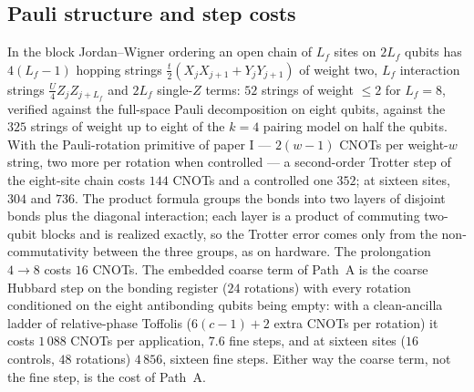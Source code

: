 \documentclass[a4paper,11pt,noarxiv]{quantumarticle}
\begin{document}
\subsection{Pauli structure and step costs}
In the block Jordan--Wigner ordering an open chain of $L_f$ sites on $2L_f$
qubits has $4(L_f-1)$ hopping strings $\tfrac t2(X_jX_{j+1}+Y_jY_{j+1})$ of
weight two, $L_f$ interaction strings $\tfrac U4Z_jZ_{j+L_f}$ and $2L_f$
single-$Z$ terms: $52$ strings of weight $\le2$ for $L_f=8$, verified
against the full-space Pauli decomposition on eight qubits, against the
$325$ strings of weight up to eight of the $k=4$ pairing model on half the
qubits.  With the Pauli-rotation primitive of paper I --- $2(w-1)$ CNOTs per
weight-$w$ string, two more per rotation when controlled --- a second-order
Trotter step of the eight-site chain costs $144$ CNOTs and a controlled one
$352$; at sixteen sites, $304$ and $736$.  The product formula groups the
bonds into two layers of disjoint bonds plus the diagonal interaction; each
layer is a product of commuting two-qubit blocks and is realized exactly, so
the Trotter error comes only from the non-commutativity between the three
groups, as on hardware.  The prolongation $4\to8$ costs $16$ CNOTs.  The
embedded coarse term of Path~A is the coarse Hubbard step on the bonding
register ($24$ rotations) with every rotation conditioned on the eight
antibonding qubits being empty: with a clean-ancilla ladder of
relative-phase Toffolis ($6(c-1)+2$ extra CNOTs per rotation) it costs
$1\,088$ CNOTs per application, $7.6$ fine steps, and at sixteen sites
($16$ controls, $48$ rotations) $4\,856$, sixteen fine steps.  Either way
the coarse term, not the fine step, is the cost of Path~A.
\end{document}
